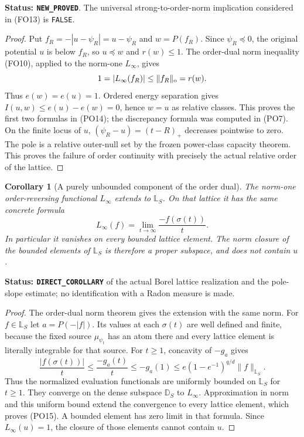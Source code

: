 \documentclass[11pt,a4paper]{article}
\numberwithin{equation}{section}
\newtheorem{corollary}[theorem]{Corollary}
\theoremstyle{definition}
\theoremstyle{remark}
\begin{document}
\noindent\textbf{Status: \texttt{NEW\_PROVED}}.  The
universal strong-to-order-norm implication considered
in \textup{(FO13)} is \texttt{FALSE}.

\begin{proof}
Put $f_R=-|u-\psi_R|=u-\psi_R$ and $w=P(f_R)$.
Since $\psi_R\preceq0$, the original potential $u$
is below $f_R$, so $u\preceq w$ and $r(w)\le1$.
The order-dual norm inequality \textup{(FO10)}, applied
to the norm-one $L_\infty$, gives
\[
       1=|L_\infty(f_R)|\le\|f_R\|_{\rm o}=r(w).
\]
Thus $e(w)=e(u)=1$.  Ordered energy separation gives
$I(u,w)\le e(u)-e(w)=0$, hence $w=u$ as relative
classes.  This proves the first two formulas in
\textup{(PO14)}; the discrepancy formula was computed
in \textup{(PO7)}.  On the finite locus of $u$,
$(\psi_R-u)=(t-R)_+$ decreases pointwise to zero.
The pole is a relative outer-null set by the frozen
power-class capacity theorem.  This proves the
failure of order continuity with precisely the
actual relative order of the lattice.
\end{proof}

\begin{corollary}[A purely unbounded component of the order dual]
\label{cor:r12-pole-dual-on-lattice}
The norm-one order-reversing functional $L_\infty$
extends to $\mathbb L_S$.  On that lattice it has the
same concrete formula
\[
                     L_\infty(f)=
                         \lim_{t\to\infty}\frac{-f(\sigma(t))}{t}.
 \tag{PO15}
\]
In particular it vanishes on every bounded lattice
element.  The norm closure of the bounded elements
of $\mathbb L_S$ is therefore a proper subspace,
and does not contain $u$.
\end{corollary}

\noindent\textbf{Status: \texttt{DIRECT\_COROLLARY}} of
the actual Borel lattice realization and the pole-slope
estimate; no identification with a Radon measure is made.

\begin{proof}
The order-dual norm theorem gives the extension with
the same norm.  For $f\in\mathbb L_S$ let
$a=P(-|f|)$.  Its values at each $\sigma(t)$ are
well defined and finite, because the fixed source
$\mu_{\psi_t}$ has an atom there and every lattice
element is literally integrable for that source.
For $t\ge1$, concavity of $-g_a$ gives
\[
 \frac{|f(\sigma(t))|}{t}
    \le\frac{-g_a(t)}t\le-g_a(1)
    \le e(1-e^{-1})^{q/d}\|f\|_{\mathbb L_S}.
\]
Thus the normalized evaluation functionals are
uniformly bounded on $\mathbb L_S$ for $t\ge1$.
They converge on the dense subspace $\mathbb D_S$
to $L_\infty$.  Approximation in norm and this uniform
bound extend the convergence to every lattice element,
which proves \textup{(PO15)}.  A bounded element has
zero limit in that formula.  Since $L_\infty(u)=1$,
the closure of those elements cannot contain $u$.
\end{proof}
\end{document}
